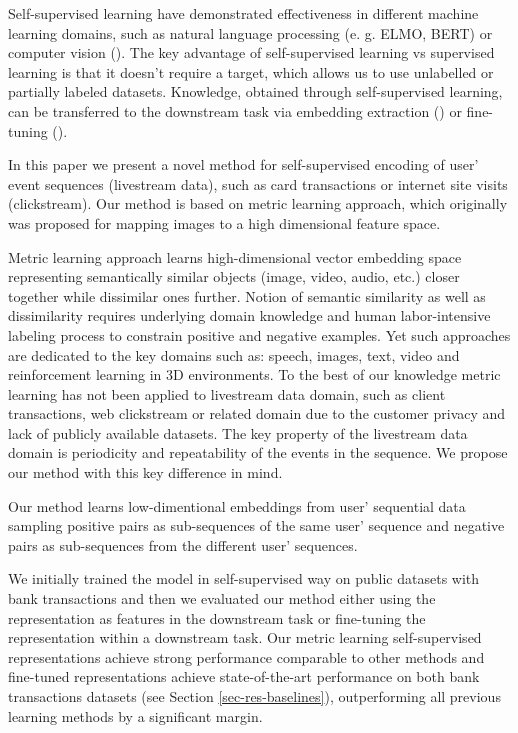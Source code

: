 \documentclass[sigconf]{acmart}
\begin{document}
Self-supervised learning have demonstrated effectiveness in different machine learning domains, such as natural language processing (e. g. ELMO\cite{ELMO2018}, BERT\cite{Devlin2019BERTPO}) or computer vision (\cite{doersch2015unsupervised}). The key advantage of self-supervised learning vs supervised learning is that it doesn't require a target, which allows us to use unlabelled or partially labeled datasets. Knowledge, obtained through self-supervised learning, can be transferred to the downstream task via embedding extraction (\cite{word2vec}) or fine-tuning (\cite{Devlin2019BERTPO}).

In this paper we present a novel method for self-supervised encoding of user' event sequences (livestream data), such as card transactions or internet site visits (clickstream). Our method is based on metric learning approach, which originally was proposed for mapping images to a high dimensional feature space.

Metric learning approach learns high-dimensional vector embedding space representing semantically similar objects (image, video, audio, etc.) closer together while dissimilar ones further. Notion of semantic similarity as well as dissimilarity requires underlying domain knowledge and human labor-intensive labeling process to constrain positive and negative examples. Yet such approaches are dedicated to the key domains such as: speech, images, text, video and reinforcement learning in 3D environments. To the best of our knowledge metric learning has not been applied to livestream data domain, such as client transactions, web clickstream or related domain due to the customer privacy and lack of publicly available datasets. The key property of the livestream data domain is periodicity and repeatability of the events in the sequence. We propose our method with this key difference in mind.

Our method learns low-dimentional embeddings from user' sequential data sampling positive pairs as sub-sequences of the same user' sequence and negative pairs as sub-sequences from the different user' sequences.

We initially trained the model in self-supervised way on public datasets with bank transactions and then we evaluated our method either using the representation as features in the downstream task or fine-tuning the representation within a downstream task. Our metric learning self-supervised 
representations achieve strong performance comparable to other methods and  fine-tuned representations achieve state-of-the-art performance on both bank transactions datasets (see Section \ref{sec-res-baselines}), outperforming all previous learning methods by a significant margin.
\end{document}
